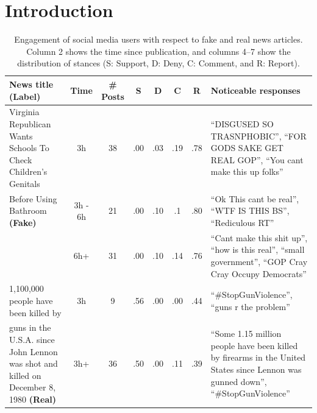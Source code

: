 \documentclass[sigconf,anonymous]{acmart}
\theoremstyle{definition}
\theoremstyle{hypothesis}
\begin{document}

\maketitle

\section{Introduction}\label{sec:introduction}

\begin{table}[tbh]
\caption{Engagement of social media users with respect to fake and real news articles. Column 2 shows the time since publication, and columns 4--7 show the distribution of stances  %
(S: Support, D: Deny, C: Comment, and R: Report).
}
  \label{table:temporal_engagement}
  \centering
  \small
  \begin{tabular}{p{4cm}ccccccp{6.5cm}}
    \toprule
    \bf News title \textbf{(Label)} & \bf Time & \bf \# Posts & \bf S & \bf D & \bf C & \bf R & \bf Noticeable responses \\ 
    \midrule
  Virginia Republican Wants Schools To Check Children's Genitals & 3h & 38 & .00 & .03 & .19 & .78 & ``DISGUSED SO TRASNPHOBIC'', ``FOR GODS SAKE  GET REAL GOP'', ``You cant make this up folks'' \\ \cline{2-8}
  Before Using Bathroom \textbf{(Fake)}  & 3h - 6h & 21  & .00 & .10 & .1 & .80 & ``Ok This cant be real'', ``WTF IS THIS BS'', ``Rediculous RT'' \\ \cline{2-8}
  & 6h+ & 31 & .00 & .10 & .14 & .76 & ``Cant make this shit up'', ``how is this real'', ``small government'', ``GOP Cray Cray  Occupy Democrats'' \\ \hline
  1,100,000 people have been killed by & 3h & 9 & .56 & .00 & .00 & .44 & ``\#StopGunViolence'', ``guns r the problem'' \\ \cline{2-8}
  guns in the U.S.A. since John Lennon was shot and killed on December 8, 1980 \textbf{(Real)} & 3h+ & 36 & .50 & .00 & .11 & .39 & ``Some 1.15 million people have been killed by firearms in the United States since Lennon was gunned down'', ``\#StopGunViolence'' \\ 
  \bottomrule
  \end{tabular}
\end{table}
\end{document}
